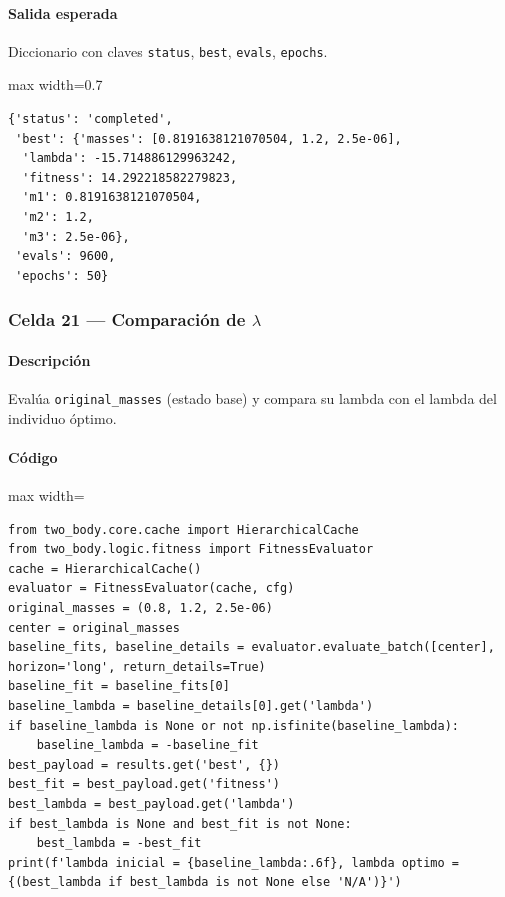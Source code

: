 \paragraph{Salida esperada} Diccionario con claves \texttt{status}, \texttt{best}, \texttt{evals}, \texttt{epochs}.

\begin{listing}[H]
\caption{Ejemplo Salida}
\begin{adjustbox}{max width=0.7\textwidth}
\begin{minipage}{\textwidth}
\begin{verbatim}
{'status': 'completed',
 'best': {'masses': [0.8191638121070504, 1.2, 2.5e-06],
  'lambda': -15.714886129963242,
  'fitness': 14.292218582279823,
  'm1': 0.8191638121070504,
  'm2': 1.2,
  'm3': 2.5e-06},
 'evals': 9600,
 'epochs': 50}
\end{verbatim}
\end{minipage}
\end{adjustbox}
\end{listing}

\subsubsection*{Celda 21 — Comparación de $\lambda$}
\paragraph{Descripción} Evalúa \texttt{original\_masses} (estado base) y compara su lambda con el lambda del individuo óptimo.
\paragraph{Código}
\begin{listing}[H]
\caption{Celda 21: comparación de exponente de Lyapunov}
\begin{adjustbox}{max width=\textwidth}
\begin{minipage}{\textwidth}
\begin{verbatim}
from two_body.core.cache import HierarchicalCache
from two_body.logic.fitness import FitnessEvaluator
cache = HierarchicalCache()
evaluator = FitnessEvaluator(cache, cfg)
original_masses = (0.8, 1.2, 2.5e-06)
center = original_masses
baseline_fits, baseline_details = evaluator.evaluate_batch([center], horizon='long', return_details=True)
baseline_fit = baseline_fits[0]
baseline_lambda = baseline_details[0].get('lambda')
if baseline_lambda is None or not np.isfinite(baseline_lambda):
    baseline_lambda = -baseline_fit
best_payload = results.get('best', {})
best_fit = best_payload.get('fitness')
best_lambda = best_payload.get('lambda')
if best_lambda is None and best_fit is not None:
    best_lambda = -best_fit
print(f'lambda inicial = {baseline_lambda:.6f}, lambda optimo = {(best_lambda if best_lambda is not None else 'N/A')}')
\end{verbatim}
\end{minipage}
\end{adjustbox}
\end{listing}
